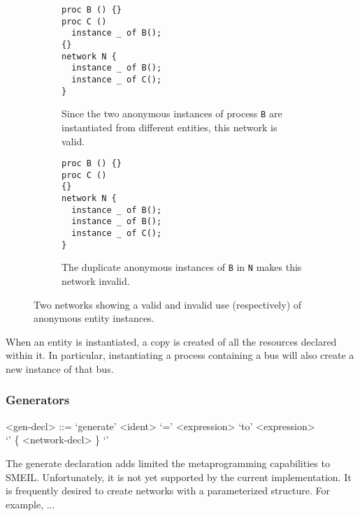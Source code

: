 \begin{figure}
  \centering
  \begin{subfigure}[t]{0.40\textwidth}
\begin{lstlisting}[language=smeil]
proc B () {}
proc C ()
  instance _ of B();
{}
network N {
  instance _ of B();
  instance _ of C();
}
\end{lstlisting}
    \caption{Since the two anonymous instances of process {\tt B} are
      instantiated from different entities, this network is valid.}
    \label{fig:ambigvalid}
    \hspace{4mm}
\end{subfigure}
\begin{subfigure}[t]{0.40\textwidth}
\begin{lstlisting}[language=smeil]
proc B () {}
proc C ()
{}
network N {
  instance _ of B();
  instance _ of B();
  instance _ of C();
}
\end{lstlisting}
    \caption{The duplicate anonymous instances of {\tt B} in {\tt N} makes this
      network invalid.}
  \end{subfigure}

  \caption{Two networks showing a valid and invalid use (respectively) of
  anonymous entity instances.}
\label{fig:anonproc}
\end{figure}

When an entity is instantiated, a copy is created of all the resources declared
within it. In particular, instantiating a process containing a bus will also
create a new instance of that bus.


\subsubsection{Generators}
\begin{grammar}
  <gen-decl> ::= `generate' <ident> `=' <expression> `to' <expression> \\ `{' \{ <network-decl> \} `}'
\end{grammar}
The {\ttfamily generate} declaration adds limited the metaprogramming
capabilities to SMEIL. Unfortunately, it is not yet supported by the current
implementation. It is frequently desired to create networks with a parameterized
structure. For example, ... 

